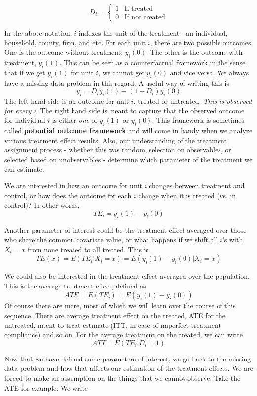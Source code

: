 \documentclass[12pt]{article}
\theoremstyle{definition}
\theoremstyle{property}
\theoremstyle{assumption}
\theoremstyle{example}
\theoremstyle{comment}
\begin{document}
\[
D_i = \begin{cases} 1 & \text{If treated} \\ 0 & \text{If not treated}\end{cases}
\]

In the above notation, $i$ indexes the unit of the treatment - an individual, household,  county, firm, and etc. For each unit $i$, there are two possible outcomes. One is the outcome without treatment,  $y_i(0)$. The other is the outcome with treatment, $y_i(1)$. This can be seen as a counterfactual framework in the sense that if we get $y_i(1)$ for unit $i$, we cannot get $y_i(0)$ and vice versa. We always have a missing data problem in this regard. A useful way of writing this is
\[
y_i = D_iy_i(1) + (1-D_i)y_i(0)
\]
The left hand side is an outcome for unit $i$, treated or untreated. \textit{This is observed for every $i$}. The right hand side is meant to capture that the observed outcome for individual $i$ is either \textit{one} of $y_i(1)$ or $y_i(0)$. This framework is sometimes called \textbf{potential outcome framework} and will come in handy when we analyze various treatment effect results. Also, our understanding of the treatment assignment process - whether this was random, selection on observables, or selected based on unobservables - determine which parameter of the treatment we can estimate.\par
We are interested in how an outcome for unit $i$ changes between treatment and control, or how does the outcome for each $i$ change when it is treated (vs. in control)? In other words,
\[
TE_i = y_i(1)-y_i(0)
\]
\par
Another parameter of interest could be the treatment effect averaged over those who share the common covariate value, or what happens if we shift all $i$'s with $X_i=x$ from none treated to all treated. This is
\[
TE(x) = E(TE_i|X_i=x)= E(y_i(1)-y_i(0)|X_i=x)
\]
\par
We could also be interested in the treatment effect averaged over the population. This is the average treatment effect, defined as
\[
ATE=E(TE_i)=E(y_i(1)-y_i(0))
\]
Of course there are more, most of which we will learn over the course of this sequence. There are average treatment effect on the treated, ATE for the untreated, intent to treat estimate (ITT, in case of imperfect treatment compliance) and so on. For the average treatment on the treated, we can write
\[
ATT = E(TE_i|D_i=1) 
\] \par
Now that we have defined some parameters of interest, we go back to the missing data problem and how that affects our estimation of the treatment effects. We are forced to make an assumption on the things that we cannot observe. Take the ATE for example. We write
\end{document}
